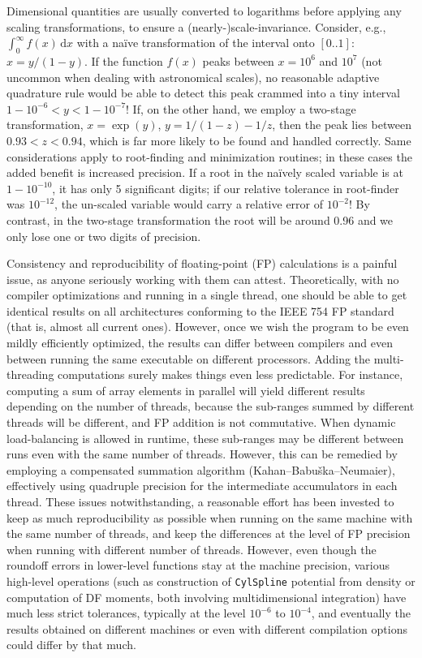 \documentclass[12pt]{article}
\renewcommand{\d}{\mathrm{d}}
\begin{document}
Dimensional quantities are usually converted to logarithms before applying any scaling transformations, to ensure a (nearly-)scale-invariance. Consider, e.g., $\int_0^\infty f(x)\,\d x$ with a na\"ive transformation of the interval onto $[0..1]$: $x = y/(1-y)$. If the function $f(x)$ peaks between $x=10^6$ and $10^7$ (not uncommon when dealing with astronomical scales), no reasonable adaptive quadrature rule would be able to detect this peak crammed into a tiny interval $1-10^{-6} < y < 1-10^{-7}$! If, on the other hand, we employ a two-stage transformation, $x = \exp(y)$, $y = 1/(1-z)-1/z$, then the peak lies between $0.93<z<0.94$, which is far more likely to be found and handled correctly. Same considerations apply to root-finding and minimization routines; in these cases the added benefit is increased precision. If a root in the na\"ively scaled variable is at $1-10^{-10}$, it has only 5 significant digits; if our relative tolerance in root-finder was $10^{-12}$, the un-scaled variable would carry a relative error of $10^{-2}$! By contrast, in the two-stage transformation the root will be around 0.96 and we only lose one or two digits of precision.

Consistency and reproducibility of floating-point (FP) calculations is a painful issue, as anyone seriously working with them can attest. Theoretically, with no compiler optimizations and running in a single thread, one should be able to get identical results on all architectures conforming to the IEEE 754 FP standard (that is, almost all current ones). However, once we wish the program to be even mildly efficiently optimized, the results can differ between compilers and even between running the same executable on different processors. Adding the multi-threading computations surely makes things even less predictable. For instance, computing a sum of array elements in parallel will yield different results depending on the number of threads, because the sub-ranges summed by different threads will be different, and FP addition is not commutative. When dynamic load-balancing is allowed in runtime, these sub-ranges may be different between runs even with the same number of threads. However, this can be remedied by employing a compensated summation algorithm (Kahan--Babu\v ska--Neumaier), effectively using quadruple precision for the intermediate accumulators in each thread. These issues notwithstanding, a reasonable effort has been invested to keep as much reproducibility as possible when running on the same machine with the same number of threads, and keep the differences at the level of FP precision when running with different number of threads. However, even though the roundoff errors in lower-level functions stay at the machine precision, various high-level operations (such as construction of \texttt{CylSpline} potential from density or computation of DF moments, both involving multidimensional integration) have much less strict tolerances, typically at the level $10^{-6}$ to $10^{-4}$, and eventually the results obtained on different machines or even with different compilation options could differ by that much.
\end{document}

